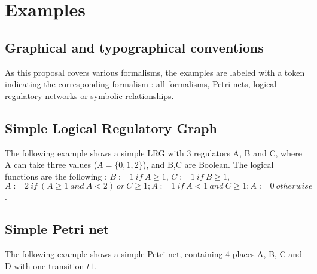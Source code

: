
\section{Examples}
\label{examples}

\subsection{Graphical and typographical conventions}

As this proposal covers various formalisms, the examples are labeled with a token indicating the corresponding formalism : \ALL all formalisms, \PN Petri nets, \LRG logical regulatory networks or \SYM symbolic relationships.

\subsection*{Simple Logical Regulatory Graph} %
\label{sub:lrg}
\LRG The following example shows a simple LRG with 3 regulators A, B and C, where A can take three values ($A=\{0,1,2\}$), and B,C are Boolean. The logical functions are the following : $B := 1\ if\ A \ge 1$, $C := 1\ if\ B \ge 1$, $A := 2\ if\ (A \ge 1\ and\ A < 2)\ or\ C \ge 1 ; A := 1\ if\ A < 1\ and\ C \ge 1 ; A := 0\  otherwise$.



\bigskip
\subsection*{Simple Petri net} %
\label{sub:ex_pn}
\PN The following example shows a simple Petri net, containing 4 places A, B, C and D with one transition $t1$.




